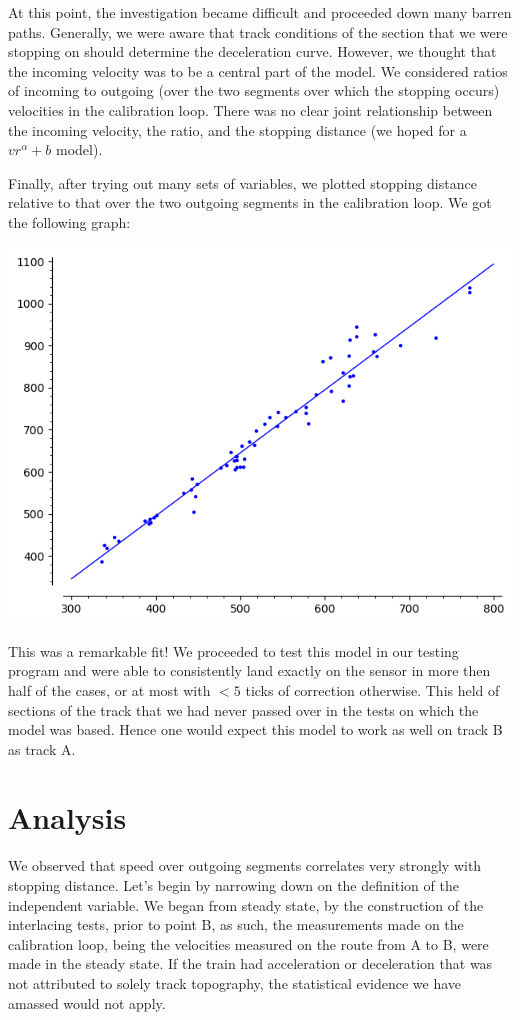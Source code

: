 \documentclass{amsart} \usepackage{amsmath} \usepackage{upgreek}
\begin{document}
At this point, the investigation became difficult and proceeded down many barren paths. Generally, we were aware that track conditions of the section that we were stopping on should determine the deceleration curve. However, we thought that the incoming velocity was to be a central part of the model. We considered ratios of incoming to outgoing (over the two segments over which the stopping occurs) velocities in the calibration loop. There was no clear joint relationship between the incoming velocity, the ratio, and the stopping distance (we hoped for a $vr^\alpha+b$ model).

\clearpage

Finally, after trying out many sets of variables, we plotted stopping distance relative to that over the two outgoing segments in the calibration loop. We got the following graph:
\begin{center}
\includegraphics[scale=0.5]{solution}
\end{center}
This was a remarkable fit! We proceeded to test this model in our testing program and were able to consistently land exactly on the sensor in more then half of the cases, or at most with $<5$ ticks of correction otherwise. This held of sections of the track that we had never passed over in the tests on which the model was based. Hence one would expect this model to work as well on track B as track A.

\section*{Analysis}

We observed that speed over outgoing segments correlates very strongly with stopping distance. Let's begin by narrowing down on the definition of the independent variable. We began from steady state, by the construction of the interlacing tests, prior to point B, as such, the measurements made on the calibration loop, being the velocities measured on the route from A to B, were made in the steady state. If the train had acceleration or deceleration that was not attributed to solely track topography, the statistical evidence we have amassed would not apply.
\end{document}
